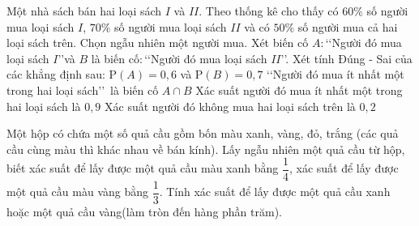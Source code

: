 \begin{ex}%
 Một nhà sách bán hai loại  sách $I$ và $II$. Theo thống kê cho thấy có $60\%$ số người mua loại sách $I$, $70\%$ số người mua loại sách $II$ và có $50\%$ số người mua cả hai loại sách trên. Chọn ngẫu nhiên một người mua. Xét biến cố $A\colon$\lq\lq Người đó mua loại sách $I$\rq\rq và $B$ là biến cố$\colon$\lq\lq Người đó mua loại sách $II$\rq\rq. Xét tính Đúng - Sai của các khẳng định sau:
  \choiceTF
  {\True $\mathrm{P}(A)=0{,}6$  và $\mathrm{P}(B)=0{,}7$}
  {\lq\lq Người đó  mua ít nhất một trong hai loại sách\rq\rq\, là biến cố $A\cap B$}
  {Xác suất người đó mua ít nhất một trong hai loại sách  là $0{,}9$}
  {\True Xác suất người đó  không mua hai loại sách trên là $0{,}2$}
\end{ex}



\begin{ex}%
	Một hộp có chứa một số quả cầu gồm bốn màu xanh, vàng, đỏ, trắng (các quả cầu cùng màu thì khác nhau về bán kính). Lấy ngẫu nhiên một quả cầu từ hộp, biết xác suất để lấy được một quả cầu màu xanh bằng $\dfrac{1}{4}$, xác suất để lấy được một quả cầu màu vàng bằng $\dfrac{1}{3}$. Tính xác suất để lấy được một quả cầu xanh hoặc một quả cầu vàng(làm  tròn đến hàng phần trăm).
\end{ex}

